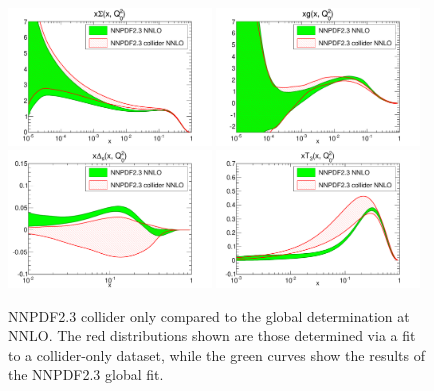 \begin{figure}[ht]
\centering
\includegraphics[width=0.48\textwidth]{6-LHCimpact/figs/xSinglet_Q_2_log-23-vs-23coll-nnlo.pdf}
\includegraphics[width=0.48\textwidth]{6-LHCimpact/figs/xg_Q_2_log-23-vs-23coll-nnlo.pdf}\\
\includegraphics[width=0.48\textwidth]{6-LHCimpact/figs/xDs_Q_2_log-23-vs-23coll-nnlo.pdf}
\includegraphics[width=0.48\textwidth]{6-LHCimpact/figs/xT3_Q_2_log-23-vs-23coll-nnlo.pdf}
\caption[NNPDF2.3 collider only compared to the global determination at NNLO]{NNPDF2.3 collider only compared to the global determination at NNLO. The red distributions shown are those determined via a fit to a collider-only dataset, while the green curves show the results of the NNPDF2.3 global fit.}
\label{fig:23vs23coll}
\end{figure}

